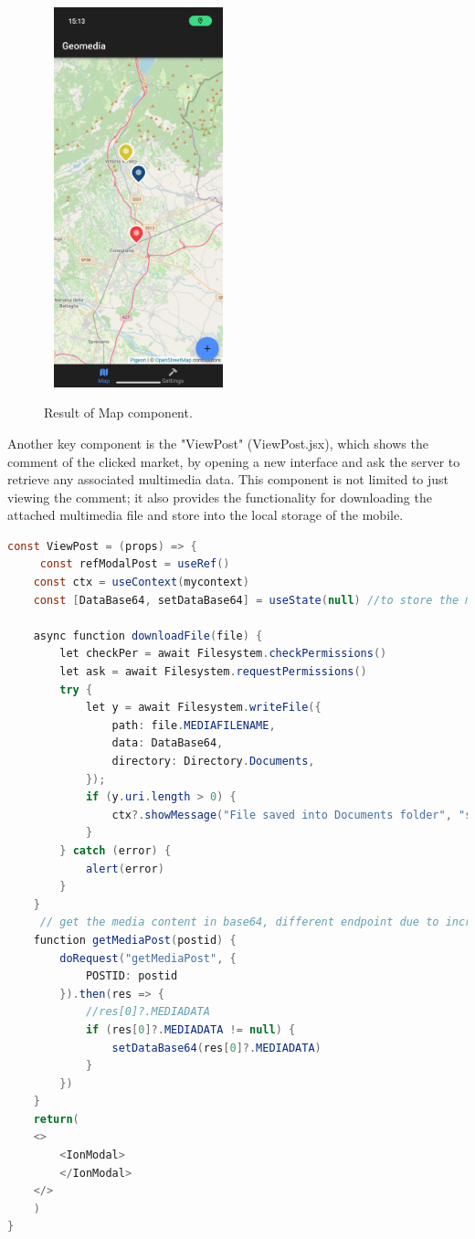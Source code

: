 \documentclass[conference]{IEEEtran}
\begin{document}
\begin{figure}[htbp]
\begin{center}
{\includegraphics[width=5.5cm, height=11cm]{imgs/Map.png}}
\end{center}
\caption{Result of Map component.}
\label{fig}
\end{figure}


Another key component is the "ViewPost" (ViewPost.jsx), which shows the comment of the clicked market, by opening a new interface and ask the server to retrieve any associated multimedia data.
This component is not limited to just viewing the comment; it also provides the functionality for downloading the attached multimedia file and store into the local storage of the mobile.


\begin{lstlisting}[language=Java, caption=ViewPost]
const ViewPost = (props) => {
     const refModalPost = useRef()
    const ctx = useContext(mycontext)
    const [DataBase64, setDataBase64] = useState(null) //to store the mediafile attached

    async function downloadFile(file) {
        let checkPer = await Filesystem.checkPermissions()
        let ask = await Filesystem.requestPermissions()
        try {
            let y = await Filesystem.writeFile({
                path: file.MEDIAFILENAME,
                data: DataBase64,
                directory: Directory.Documents,
            });
            if (y.uri.length > 0) {
                ctx?.showMessage("File saved into Documents folder", "success")
            }
        } catch (error) {
            alert(error)
        }
    }
     // get the media content in base64, different endpoint due to increment performance
    function getMediaPost(postid) {
        doRequest("getMediaPost", {
            POSTID: postid
        }).then(res => {
            //res[0]?.MEDIADATA
            if (res[0]?.MEDIADATA != null) {
                setDataBase64(res[0]?.MEDIADATA)
            }
        })
    }
    return(
    <>
        <IonModal>
        </IonModal>
    </>
    )
}
\end{lstlisting}
\end{document}
